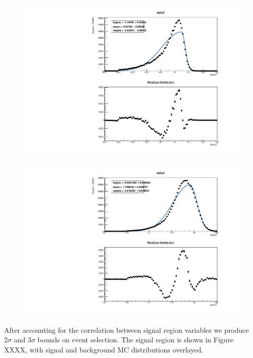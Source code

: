 \documentclass[12pt]{thesis}  %
\begin{document}
\begin{figure}[h]
\centering
\begin{minipage}{.5\textwidth}
  \centering
  \includegraphics[width=\linewidth]{images/tauMG-deltaE_fit_agauss.pdf}
  \label{fig:test1}
\end{minipage}%
\begin{minipage}{.5\textwidth}
  \centering
  \includegraphics[width=\linewidth]{images/tauMG-invMass_fit_agauss.pdf}
  \label{fig:test2}
\end{minipage}
\end{figure}

After accounting for the correlation between signal region variables we produce $2\sigma$ and $3\sigma$ bounds on event selection. The signal region is shown in Figure XXXX, with signal and background MC distributions overlayed.
\end{document}
